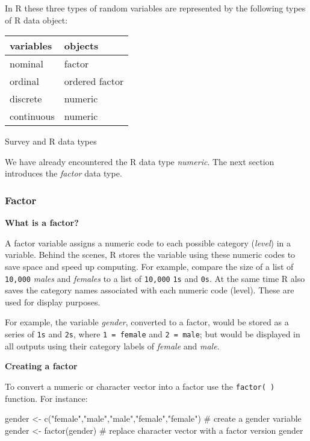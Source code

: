 \documentclass[
  letterpaper,
  krantz2]{style/krantz}
\newenvironment{Shaded}{\begin{snugshade}}{\end{snugshade}}
\newcommand{\CommentTok}[1]{\textcolor[rgb]{0.37,0.37,0.37}{#1}}
\newcommand{\FunctionTok}[1]{\textcolor[rgb]{0.28,0.35,0.67}{#1}}
\newcommand{\NormalTok}[1]{\textcolor[rgb]{0.00,0.23,0.31}{#1}}
\newcommand{\OtherTok}[1]{\textcolor[rgb]{0.00,0.23,0.31}{#1}}
\newcommand{\StringTok}[1]{\textcolor[rgb]{0.13,0.47,0.30}{#1}}
\begin{document}
In R these three types of random variables are represented by the
following types of R data object:

\begin{tabular}{l|l}
\hline
variables & objects\\
\hline
nominal & factor\\
\hline
ordinal & ordered factor\\
\hline
discrete & numeric\\
\hline
continuous & numeric\\
\hline
\end{tabular}

Survey and R data types

We have already encountered the R data type \emph{numeric}. The next
section introduces the \emph{factor} data type.

\hypertarget{factor}{%
\subsubsection{Factor}\label{factor}}

\textbf{What is a factor?}

A factor variable assigns a numeric code to each possible category
(\emph{level}) in a variable. Behind the scenes, R stores the variable
using these numeric codes to save space and speed up computing. For
example, compare the size of a list of \texttt{10,000} \emph{males} and
\emph{females} to a list of \texttt{10,000} \texttt{1s} and \texttt{0s}.
At the same time R also saves the category names associated with each
numeric code (level). These are used for display purposes.

For example, the variable \emph{gender}, converted to a factor, would be
stored as a series of \texttt{1s} and \texttt{2s}, where
\texttt{1\ =\ female} and \texttt{2\ =\ male}; but would be displayed in
all outputs using their category labels of \emph{female} and
\emph{male}.

\textbf{Creating a factor}

To convert a numeric or character vector into a factor use the
\texttt{factor(\ )} function. For instance:

\begin{Shaded}
\begin{Highlighting}[]
\NormalTok{gender }\OtherTok{\textless{}{-}} \FunctionTok{c}\NormalTok{(}\StringTok{"female"}\NormalTok{,}\StringTok{"male"}\NormalTok{,}\StringTok{"male"}\NormalTok{,}\StringTok{"female"}\NormalTok{,}\StringTok{"female"}\NormalTok{) }\CommentTok{\# create a gender variable}
\NormalTok{gender }\OtherTok{\textless{}{-}} \FunctionTok{factor}\NormalTok{(gender) }\CommentTok{\# replace character vector with a factor version}
\NormalTok{gender}
\end{Highlighting}
\end{Shaded}
\end{document}
